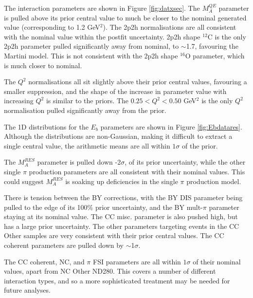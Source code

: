 The interaction parameters are shown in Figure \ref{fig:datxsec}. The $M^{QE}_A$ parameter is pulled above its prior central value to much be closer to the nominal generated value (corresponding to 1.2 GeV$^2$). The 2p2h normalisations are all consistent with the nominal value within the postfit uncertainty. 2p2h shape $^{12}$C is the only 2p2h parameter pulled significantly away from nominal, to $\sim$1.7, favouring the Martini model. This is not consistent with the 2p2h shape $^{16}$O parameter, which is much closer to nominal.

The $Q^2$ normalisations all sit slightly above their prior central values, favouring a smaller suppression, and the shape of the increase in parameter value with increasing $Q^2$ is similar to the priors. The $0.25 < Q^2< 0.50$ GeV$^2$ is the only $Q^2$ normalisation pulled significantly away from the prior.

The 1D distributions for the $E_b$ parameters are shown in Figure \ref{fig:Ebdatares}. Although the distributions are non-Gaussian, making it difficult to extract a single central value, the arithmetic means are all within $1\sigma$ of the prior.

The $M_A^{RES}$ parameter is pulled down -2$\sigma$, of its prior uncertainty, while the other single $\pi$ production parameters are all consistent with their nominal values. This could suggest $M_A^{RES}$ is soaking up deficiencies in the single $\pi$ production model.

There is tension between the BY corrections, with the BY DIS parameter being pulled to the edge of its 100$\%$ prior uncertainty, and the BY mult-$\pi$ parameter staying at its nominal value. The CC misc. parameter is also pushed high, but has a large prior uncertainty. The other parameters targeting events in the CC Other samples are very consistent with their prior central values. The CC coherent parameters are pulled down by $\sim$1$\sigma$.

The CC coherent, NC, and $\pi$ FSI parameters are all within $1\sigma$ of their nominal values, apart from NC Other ND280. This covers a number of different interaction types, and so a more sophisticated treatment may be needed for future analyses. 


